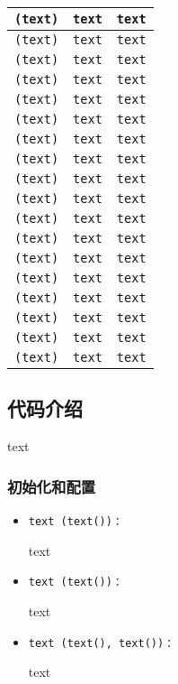 \begin{center}
{\begin{tabular}{|C{5cm}|C{4cm}|C{7cm}|}
      \hline
      \texttt{(text)} & \texttt{text} & \texttt{text} \\
      \hline
      \texttt{(text)} & \texttt{text} & \texttt{text} \\
      \hline
      \texttt{(text)} & \texttt{text} & \texttt{text} \\
      \hline
      \texttt{(text)} & \texttt{text} & \texttt{text} \\
      \hline
      \texttt{(text)} & \texttt{text} & \texttt{text} \\
      \hline
      \texttt{(text)} & \texttt{text} & \texttt{text} \\
      \hline
      \texttt{(text)} & \texttt{text} & \texttt{text} \\
      \hline
      \texttt{(text)} & \texttt{text} & \texttt{text} \\
      \hline
      \texttt{(text)} & \texttt{text} & \texttt{text} \\
      \hline
      \texttt{(text)} & \texttt{text} & \texttt{text} \\
      \hline
      \texttt{(text)} & \texttt{text} & \texttt{text} \\
      \hline
      \texttt{(text)} & \texttt{text} & \texttt{text} \\
      \hline
      \texttt{(text)} & \texttt{text} & \texttt{text} \\
      \hline
      \texttt{(text)} & \texttt{text} & \texttt{text} \\
      \hline
      \texttt{(text)} & \texttt{text} & \texttt{text} \\
      \hline
      \texttt{(text)} & \texttt{text} & \texttt{text} \\
      \hline
      \texttt{(text)} & \texttt{text} & \texttt{text} \\
      \hline
      \texttt{(text)} & \texttt{text} & \texttt{text} \\
      \hline
		\end{tabular}
    }
  \end{center}

\subsection{代码介绍}
text
\subsubsection{初始化和配置}
\begin{itemize}
    \item \begin{verbatim}text (text())：\end{verbatim}text
    \item \begin{verbatim}text (text())：\end{verbatim}text
    \item \begin{verbatim}text (text(), text())：\end{verbatim}text
\end{itemize}



